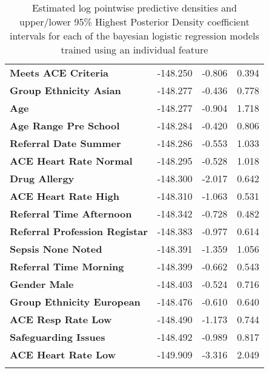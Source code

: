 {\begin{longtable}[H]{llll}
        \textbf{Meets ACE Criteria}          & -148.250           & -0.806              & 0.394                \\
        \textbf{Group Ethnicity Asian}          & -148.277           & -0.436              & 0.778                \\
        \textbf{Age}                              & -148.277           & -0.904              & 1.718                \\
        \textbf{Age Range Pre School}          & -148.284           & -0.420              & 0.806                \\
        \textbf{Referral Date Summer}           & -148.286           & -0.553              & 1.033                \\
        \textbf{ACE Heart Rate Normal}    & -148.295           & -0.528              & 1.018                \\
        \textbf{Drug Allergy}                 & -148.300           & -2.017              & 0.642                \\
        \textbf{ACE Heart Rate High}      & -148.310           & -1.063              & 0.531                \\
        \textbf{Referral Time Afternoon}        & -148.342           & -0.728              & 0.482                \\
        \textbf{Referral Profession Registar}   & -148.383           & -0.977              & 0.614                \\
        \textbf{Sepsis None Noted}               & -148.391           & -1.359              & 1.056                \\
        \textbf{Referral Time Morning}          & -148.399           & -0.662              & 0.543                \\
        \textbf{Gender Male}                        & -148.403           & -0.524              & 0.716                \\
        \textbf{Group Ethnicity European}       & -148.476           & -0.610              & 0.640                \\
        \textbf{ACE Resp Rate Low}        & -148.490           & -1.173              & 0.744                \\
        \textbf{Safeguarding Issues}                  & -148.492           & -0.989              & 0.817                \\
        \textbf{ACE Heart Rate Low}       & -149.909           & -3.316              & 2.049 \\\toprule
    \caption[Cross-validation of Batesian logistic regression models]{Estimated log pointwise predictive densities and upper/lower 95\% Highest Posterior Density coefficient intervals for each of the bayesian logistic regression models trained using an individual feature}
    \label{tab:sf-results}
\end{longtable}
}

